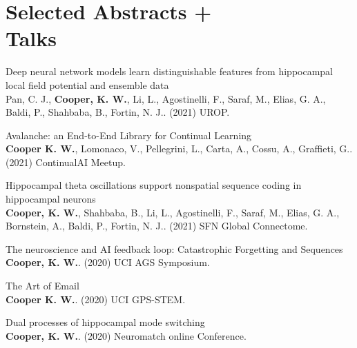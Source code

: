 \documentclass[10pt]{cooperCV2}
\begin{document}
%	






\section{Selected Abstracts +  \\Talks}

 
\begin{etaremune}[itemindent=-1.5\bibhang, topsep=0pt,
				   itemsep=\bibsep,partopsep=0pt,parsep=0pt,leftmargin={\bibhang+\widthof{[999]}}] 
    
    \item Deep neural network models learn distinguishable features from hippocampal local field potential and ensemble data\\ Pan, C. J., \textbf{Cooper, K. W.}, Li, L., Agostinelli, F., Saraf, M., Elias, G. A., Baldi, P.,  Shahbaba, B., Fortin, N. J.. (2021) UROP. 
     
	
    \item Avalanche: an End-to-End Library for Continual Learning\\ \textbf{Cooper K. W.}, Lomonaco, V., Pellegrini, L., Carta, A., Cossu, A., Graffieti, G.. (2021) ContinualAI Meetup. 
     
	
    \item Hippocampal theta oscillations support nonspatial sequence coding in hippocampal neurons\\ \textbf{Cooper, K. W.}, Shahbaba, B., Li, L., Agostinelli, F., Saraf, M., Elias, G. A., Bornstein, A., Baldi, P.,  Fortin, N. J.. (2021) SFN Global Connectome. 
     
	
    \item The neuroscience and AI feedback loop: Catastrophic Forgetting and Sequences\\ \textbf{Cooper, K. W.}. (2020) UCI AGS Symposium. 
     
	
    \item The Art of Email\\ \textbf{Cooper K. W.}. (2020) UCI GPS-STEM. 
     
	
    \item Dual processes of hippocampal mode switching\\ \textbf{Cooper, K. W.}. (2020) Neuromatch online Conference. 
     

\end{etaremune}
\end{document}

